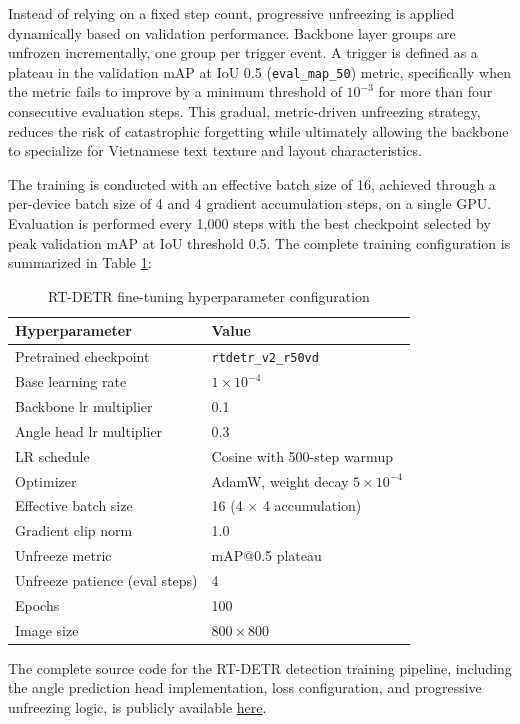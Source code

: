 Instead of relying on a fixed step count, progressive unfreezing is applied dynamically based on validation performance. Backbone layer groups are unfrozen incrementally, one group per trigger event. A trigger is defined as a plateau in the validation mAP at IoU 0.5 (\texttt{eval\_map\_50}) metric, specifically when the metric fails to improve by a minimum threshold of $10^{-3}$ for more than four consecutive evaluation steps. This gradual, metric-driven unfreezing strategy, reduces the risk of catastrophic forgetting while ultimately allowing the backbone to specialize for Vietnamese text texture and layout characteristics.

The training is conducted with an effective batch size of 16, achieved through a per-device batch size of 4 and 4 gradient accumulation steps, on a single GPU. Evaluation is performed every 1,000 steps with the best checkpoint selected by peak validation mAP at IoU threshold 0.5. The complete training configuration is summarized in Table \ref{tab:rtdetr_config}:

\begin{table}[H]
\centering
\scriptsize 
\caption{RT-DETR fine-tuning hyperparameter configuration}
\label{tab:rtdetr_config}
\begin{tabular}{ll}
\hline
\textbf{Hyperparameter} & \textbf{Value} \\
\hline
Pretrained checkpoint & \texttt{rtdetr\_v2\_r50vd} \\
Base learning rate & $1 \times 10^{-4}$ \\
Backbone lr multiplier & 0.1 \\
Angle head lr multiplier & 0.3 \\
LR schedule & Cosine with 500-step warmup \\
Optimizer & AdamW, weight decay $5 \times 10^{-4}$ \\
Effective batch size & 16 (4 $\times$ 4 accumulation) \\
Gradient clip norm & 1.0 \\
Unfreeze metric & mAP@0.5 plateau \\
Unfreeze patience (eval steps) & 4 \\
Epochs & 100 \\
Image size & $800 \times 800$ \\
\hline
\end{tabular}
\end{table}

The complete source code for the RT-DETR detection training pipeline, including the angle prediction head implementation, loss configuration, and progressive unfreezing logic, is publicly available \href{https://github.com/Atunnah/Graduation_Thesis/tree/main/detect}{\underline{here}}.

